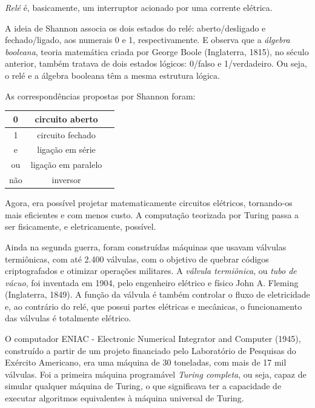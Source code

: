 \documentclass{hipatia}
\begin{document}
\textit{Relé} é, basicamente, um interruptor acionado por uma corrente elétrica.

A ideia de Shannon associa os dois estados do relé: aberto/desligado e fechado/ligado, aos numerais 0 e 1, respectivamente. E observa que a \textit{álgebra booleana}, teoria matemática criada por George Boole (Inglaterra, 1815), no século anterior, também tratava de dois estados lógicos: 0/falso e 1/verdadeiro. Ou seja, o relé e a álgebra booleana têm a mesma estrutura lógica.

As correspondências propostas por Shannon foram:

\begin{table}[h!]
    \centering
    \label{tab:exemplo}
    \begin{tabular}{|c|c|c|}
        \hline
        0   &  circuito aberto      \\
        \hline
        1   &  circuito fechado  \\
        \hline
        e  & ligação em série \\
        \hline
        ou & ligação em paralelo\\
        \hline
        não & inversor\\
        \hline
    \end{tabular}
\end{table}

Agora, era possível projetar matematicamente circuitos elétricos, tornando-os mais eficientes e com menos custo. A computação teorizada por Turing passa a ser fisicamente, e eletricamente, possível. 

Ainda na segunda guerra, foram construídas máquinas que usavam válvulas termiônicas, com até 2.400 válvulas, com o objetivo de quebrar códigos criptografados e otimizar operações militares. A \textit{válvula termiônica}, ou \textit{tubo de vácuo}, foi inventada em 1904, pelo engenheiro elétrico e físico John A. Fleming (Inglaterra, 1849). A função da válvula é também controlar o fluxo de eletricidade e, ao contrário do relé, que possui partes elétricas e mecânicas,  o funcionamento das válvulas é totalmente elétrico. 

O computador ENIAC - Electronic Numerical Integrator and Computer (1945), construído a partir de um projeto financiado pelo Laboratório de Pesquisas do Exército Americano, era uma máquina de 30 toneladas, com mais de 17 mil válvulas. Foi a primeira máquina programável \emph{Turing completa}, ou seja, capaz de simular qualquer máquina de Turing, o que significava ter a capacidade de executar algoritmos equivalentes à máquina universal de Turing.
\end{document}
